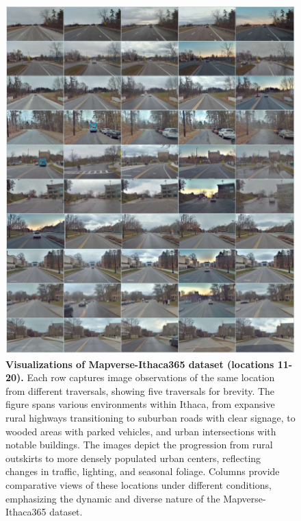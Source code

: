 \begin{figure}
    \centering
    \includegraphics[width=1\linewidth]{figs_compressed/ithaca-2_compressed.pdf}
    \caption{\textbf{Visualizations of Mapverse-Ithaca365 dataset (locations 11-20).} Each row captures image observations of the same location from different traversals, showing five traversals for brevity. The figure spans various environments within Ithaca, from expansive rural highways transitioning to suburban roads with clear signage, to wooded areas with parked vehicles, and urban intersections with notable buildings. The images depict the progression from rural outskirts to more densely populated urban centers, reflecting changes in traffic, lighting, and seasonal foliage. Columns provide comparative views of these locations under different conditions, emphasizing the dynamic and diverse nature of the Mapverse-Ithaca365 dataset.}
    \label{fig:ithaca-2}
\end{figure}


